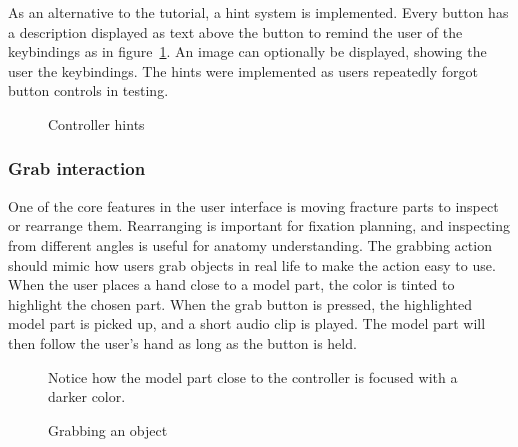 \documentclass[a4paper]{report}
\begin{document}
As an alternative to the tutorial, a hint system is implemented. Every button has a description displayed as text above the button to remind the user of the keybindings as in figure~\ref{hints}. An image can optionally be displayed, showing the user the keybindings. The hints were implemented as users repeatedly forgot button controls in testing.

\begin{figure}[h!]
    \centering
	\hfill
  \caption{Controller hints}\label{hints}
  \small
\end{figure}

\subsubsection{Grab interaction}

One of the core features in the user interface is moving fracture parts to inspect or rearrange them. Rearranging is important for fixation planning, and inspecting from different angles is useful for anatomy understanding.
The grabbing action should mimic how users grab objects in real life to make the action easy to use. When the user places a hand close to a model part, the color is tinted to highlight the chosen part. When the grab button is pressed, the highlighted model part is picked up, and a short audio clip is played. The model part will then follow the user's hand as long as the button is held.

\begin{figure}[h!]
    \centering
	\hfill
  \caption{Grabbing an object}\label{grabbing}
  \small
  Notice how the model part close to the controller is focused with a darker color.
\end{figure}
\end{document}
